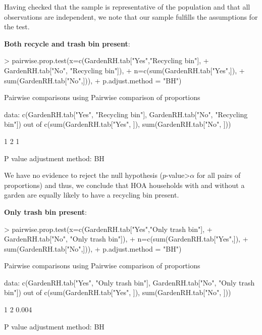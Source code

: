 \documentclass{article}
\begin{document}

Having checked that the sample is representative of the population and that all observations are independent, we note that our sample fulfills the assumptions for the test.

\textbf{Both recycle and trash bin present}:

\begin{Schunk}
\begin{Sinput}
> pairwise.prop.test(x=c(GardenRH.tab["Yes","Recycling bin"],
+   GardenRH.tab["No", "Recycling bin"]), 
+       n=c(sum(GardenRH.tab["Yes",]), 
+       sum(GardenRH.tab["No",])),
+       p.adjust.method = "BH")
\end{Sinput}
\begin{Soutput}
	Pairwise comparisons using Pairwise comparison of proportions 

data:  c(GardenRH.tab["Yes", "Recycling bin"], GardenRH.tab["No", "Recycling bin"]) out of c(sum(GardenRH.tab["Yes", ]), sum(GardenRH.tab["No", ])) 

  1
2 1

P value adjustment method: BH 
\end{Soutput}
\end{Schunk}

We have no evidence to reject the null hypothesis ($p$-value>$\alpha$ for all pairs of proportions) and thus, we conclude that HOA households with and without a garden are equally likely to have a recycling bin present.

\textbf{Only trash bin present}:

\begin{Schunk}
\begin{Sinput}
> pairwise.prop.test(x=c(GardenRH.tab["Yes","Only trash bin"],
+   GardenRH.tab["No", "Only trash bin"]), 
+       n=c(sum(GardenRH.tab["Yes",]), 
+       sum(GardenRH.tab["No",])),
+       p.adjust.method = "BH")
\end{Sinput}
\begin{Soutput}
	Pairwise comparisons using Pairwise comparison of proportions 

data:  c(GardenRH.tab["Yes", "Only trash bin"], GardenRH.tab["No", "Only trash bin"]) out of c(sum(GardenRH.tab["Yes", ]), sum(GardenRH.tab["No", ])) 

  1    
2 0.004

P value adjustment method: BH 
\end{Soutput}
\end{Schunk}
\end{document}
